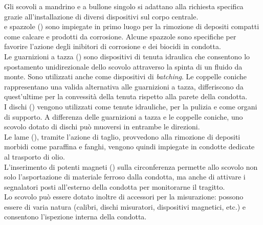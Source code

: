 Gli scovoli a mandrino e a bullone singolo si adattano alla richiesta specifica grazie all'installazione di diversi dispositivi sul corpo centrale.\\
e spazzole () sono impiegate in primo luogo per la rimozione di depositi compatti come calcare e prodotti da corrosione. Alcune spazzole sono specifiche per favorire l'azione degli inibitori di corrosione e dei biocidi in condotta.\\
Le guarnizioni a tazza () sono dispositivi di tenuta idraulica che consentono lo spostamento unidirezionale dello scovolo attraverso la spinta di un fluido da monte. Sono utilizzati anche come dispositivi di \textit{batching}. Le coppelle coniche rappresentano una valida alternativa alle guarnizioni a tazza, differiscono da quest'ultime per la convessità della tenuta rispetto alla parete della condotta.\\
I dischi () vengono utilizzati come tenute idrauliche, per la pulizia e come organi di supporto. A differenza delle guarnizioni a tazza e le coppelle coniche, uno scovolo dotato di dischi può muoversi in entrambe le direzioni.\\
Le lame (), tramite l'azione di taglio, provvedono alla rimozione di depositi morbidi come paraffina e fanghi, vengono quindi impiegate in condotte dedicate al trasporto di olio.\\
L'inserimento di potenti magneti () sulla circonferenza permette allo scovolo non solo l'asportazione di materiale ferroso dalla condotta, ma anche di attivare i segnalatori posti all'esterno della condotta per monitorarne il tragitto.\\
Lo scovolo può essere dotato inoltre di accessori per la misurazione: possono essere di varia natura (calibri, dischi misuratori, dispositivi magnetici, etc.) e consentono l'ispezione interna della condotta.



